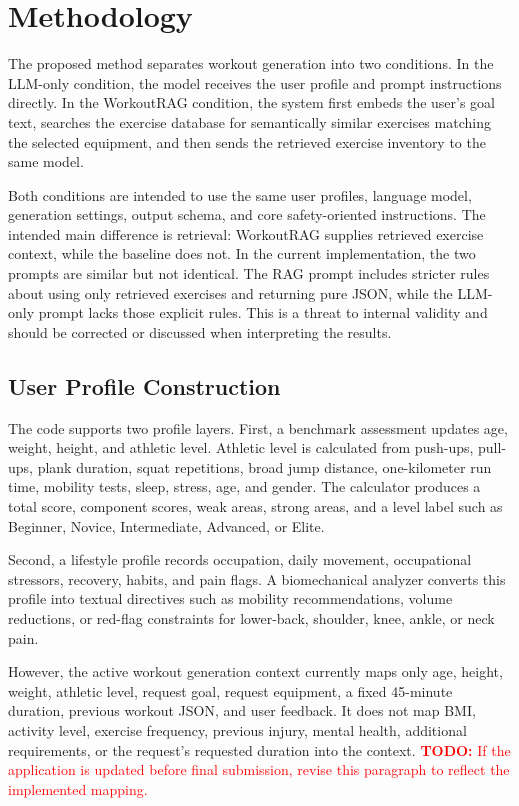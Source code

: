 \documentclass[12pt]{article}
\newcommand{\todo}[1]{\textcolor{red}{\textbf{TODO:} #1}}
\begin{document}
\section{Methodology}
The proposed method separates workout generation into two conditions. In the LLM-only condition, the model receives the user profile and prompt instructions directly. In the WorkoutRAG condition, the system first embeds the user's goal text, searches the exercise database for semantically similar exercises matching the selected equipment, and then sends the retrieved exercise inventory to the same model.

Both conditions are intended to use the same user profiles, language model, generation settings, output schema, and core safety-oriented instructions. The intended main difference is retrieval: WorkoutRAG supplies retrieved exercise context, while the baseline does not. In the current implementation, the two prompts are similar but not identical. The RAG prompt includes stricter rules about using only retrieved exercises and returning pure JSON, while the LLM-only prompt lacks those explicit rules. This is a threat to internal validity and should be corrected or discussed when interpreting the results.

\subsection{User Profile Construction}
The code supports two profile layers. First, a benchmark assessment updates age, weight, height, and athletic level. Athletic level is calculated from push-ups, pull-ups, plank duration, squat repetitions, broad jump distance, one-kilometer run time, mobility tests, sleep, stress, age, and gender. The calculator produces a total score, component scores, weak areas, strong areas, and a level label such as Beginner, Novice, Intermediate, Advanced, or Elite.

Second, a lifestyle profile records occupation, daily movement, occupational stressors, recovery, habits, and pain flags. A biomechanical analyzer converts this profile into textual directives such as mobility recommendations, volume reductions, or red-flag constraints for lower-back, shoulder, knee, ankle, or neck pain.

However, the active workout generation context currently maps only age, height, weight, athletic level, request goal, request equipment, a fixed 45-minute duration, previous workout JSON, and user feedback. It does not map BMI, activity level, exercise frequency, previous injury, mental health, additional requirements, or the request's requested duration into the context. \todo{If the application is updated before final submission, revise this paragraph to reflect the implemented mapping.}
\end{document}
